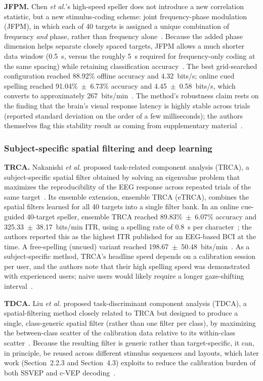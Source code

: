 \documentclass[11pt]{article}
\begin{document}
\textbf{JFPM.} Chen \textit{et al.}'s high-speed speller does not introduce a new correlation statistic, but a new stimulus-coding scheme: joint frequency-phase modulation (JFPM), in which each of 40 targets is assigned a unique combination of frequency \emph{and} phase, rather than frequency alone~\cite{chen2015pnas}. Because the added phase dimension helps separate closely spaced targets, JFPM allows a much shorter data window (0.5~s, versus the roughly 5~s required for frequency-only coding at the same spacing) while retaining classification accuracy~\cite{chen2015pnas}. The best grid-searched configuration reached 88.92\% offline accuracy and 4.32~bits/s; online cued spelling reached 91.04\%~$\pm$~6.73\% accuracy and 4.45~$\pm$~0.58~bits/s, which converts to approximately 267~bits/min~\cite{chen2015pnas}. The method's robustness claim rests on the finding that the brain's visual response latency is highly stable across trials (reported standard deviation on the order of a few milliseconds); the authors themselves flag this stability result as coming from supplementary material~\cite{chen2015pnas}.

\subsubsection{Subject-specific spatial filtering and deep learning}

\textbf{TRCA.} Nakanishi \textit{et al.} proposed task-related component analysis (TRCA), a subject-specific spatial filter obtained by solving an eigenvalue problem that maximizes the reproducibility of the EEG response across repeated trials of the same target~\cite{nakanishi2018trca}. Its ensemble extension, ensemble TRCA (eTRCA), combines the spatial filters learned for all 40 targets into a single filter bank. In an online cue-guided 40-target speller, ensemble TRCA reached 89.83\%~$\pm$~6.07\% accuracy and 325.33~$\pm$~38.17~bits/min ITR, using a spelling rate of 0.8~s per character~\cite{nakanishi2018trca}; the authors reported this as the highest ITR published for an EEG-based BCI at the time. A free-spelling (uncued) variant reached 198.67~$\pm$~50.48~bits/min~\cite{nakanishi2018trca}. As a subject-specific method, TRCA's headline speed depends on a calibration session per user, and the authors note that their high spelling speed was demonstrated with experienced users; naive users would likely require a longer gaze-shifting interval~\cite{nakanishi2018trca}.

\textbf{TDCA.} Liu \textit{et al.} proposed task-discriminant component analysis (TDCA), a spatial-filtering method closely related to TRCA but designed to produce a single, class-generic spatial filter (rather than one filter per class), by maximizing the between-class scatter of the calibration data relative to its within-class scatter~\cite{liu2021tdca}. Because the resulting filter is generic rather than target-specific, it can, in principle, be reused across different stimulus sequences and layouts, which later work (Section~2.2.3 and Section~4.3) exploits to reduce the calibration burden of both SSVEP and c-VEP decoding~\cite{liu2021tdca}.
\end{document}
